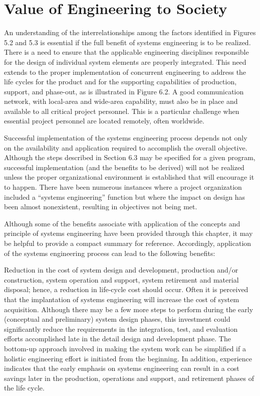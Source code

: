 \section{Value of Engineering to Society}

An understanding of the interrelationships among the factors identified in Figures 5.2 and 5.3 is essential if the full benefit of systems engineering is to be realized. There is a need to ensure that the applicable engineering disciplines responsible for the design of individual system elements are properly integrated. This need extends to the proper implementation of concurrent engineering to address the life cycles for the product and for the supporting capabilities of production, support, and phase-out, as is illustrated in Figure 6.2. A good communication network, with local-area and wide-area capability, must also be in place and available to all critical project personnel. This is a particular challenge when essential project personnel are located remotely, often worldwide.

Successful implementation of the systems engineering process depends not only on the availability and application required to accomplish the overall objective. Although the steps described in Section 6.3 may be specified for a given program, successful implementation (and the benefits to be derived) will not be realized unless the proper organizational environment is established that will encourage it to happen. There have been numerous instances where a project organization included a “systems engineering” function but where the impact on design has been almost nonexistent, resulting in objectives not being met.

Although some of the benefits associate with application of the concepts and principle of systems engineering have been provided through this chapter, it may be helpful to provide a compact summary for reference. Accordingly, application of the systems engineering process can lead to the following benefits:

Reduction in the cost of system design and development, production and/or construction, system operation and support, system retirement and material disposal; hence, a reduction in life-cycle cost should occur. Often it is perceived that the implantation of systems engineering will increase the cost of system acquisition. Although there may be a few more steps to perform during the early (conceptual and preliminary) system design phases, this investment could significantly reduce the requirements in the integration, test, and evaluation efforts accomplished late in the detail design and development phase. The bottom-up approach involved in making the system work can be simplified if a holistic engineering effort is initiated from the beginning. In addition, experience indicates that the early emphasis on systems engineering can result in a cost savings later in the production, operations and support, and retirement phases of the life cycle.

